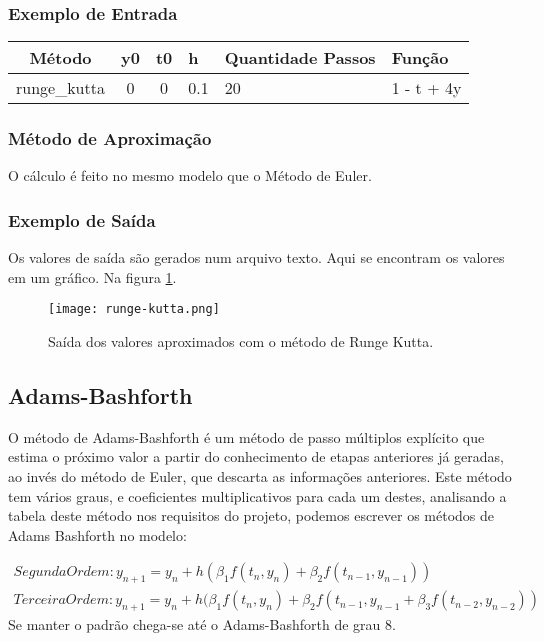 \documentclass[a4paper]{article}
\begin{document}
\subsubsection{Exemplo de Entrada}
\begin{table}[H]
\centering
\begin{tabular}{|c|c|c|l|l|l|}
\hline
Método & y0 & t0 & h   & Quantidade Passos & Função \\ \hline
runge\_kutta  & 0  & 0  & 0.1 & 20                &  1 - t + 4y      \\ \hline
\end{tabular}
\end{table}
\subsubsection{Método de Aproximação}
O cálculo é feito no mesmo modelo que o Método de Euler.
\subsubsection{Exemplo de Saída}
Os valores de saída são gerados num arquivo texto. Aqui se encontram os valores em um gráfico. Na figura \ref{fig:runge_kutta}.
\begin{figure}
\centering
\texttt{[image: runge-kutta.png]}
\caption{\label{fig:runge_kutta}Saída dos valores aproximados com o método de Runge Kutta.}
\end{figure}


\newpage
\subsection{Adams-Bashforth}

O método de Adams-Bashforth é um método de passo múltiplos explícito que estima o próximo valor a partir do conhecimento de etapas anteriores já geradas, ao invés do método de Euler, que descarta as informações anteriores. Este método  tem vários graus, e coeficientes multiplicativos para cada um destes, analisando a tabela deste método nos requisitos do projeto, podemos escrever os métodos de Adams Bashforth no modelo:

\begin{equation}\label{eq:eq_a_b}
\begin{aligned}
Segunda Ordem: y_{n+1} = y_n + h(\beta_1f(t_{n},y_{n}) + \beta_2f(t_{n-1},y_{n-1})) \\
Terceira Ordem: y_{n+1} = y_n + h(\beta_1f(t_{n},y_{n}) + \beta_2f(t_{n-1},y_{n-1} + \beta_3f(t_{n-2},y_{n-2}))
\end{aligned}
\end{equation}
Se manter o padrão chega-se até o Adams-Bashforth de grau 8.
\end{document}
